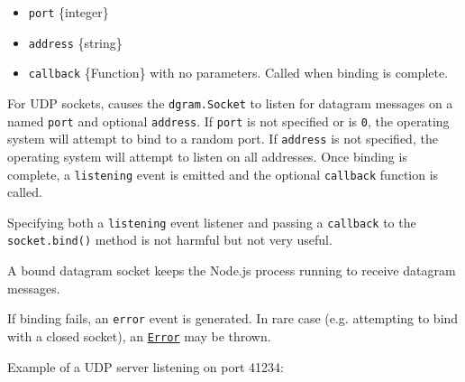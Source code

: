 \begin{itemize}
\tightlist
\item
  \texttt{port} \{integer\}
\item
  \texttt{address} \{string\}
\item
  \texttt{callback} \{Function\} with no parameters. Called when binding
  is complete.
\end{itemize}

For UDP sockets, causes the \texttt{dgram.Socket} to listen for datagram
messages on a named \texttt{port} and optional \texttt{address}. If
\texttt{port} is not specified or is \texttt{0}, the operating system
will attempt to bind to a random port. If \texttt{address} is not
specified, the operating system will attempt to listen on all addresses.
Once binding is complete, a
\texttt{\textquotesingle{}listening\textquotesingle{}} event is emitted
and the optional \texttt{callback} function is called.

Specifying both a \texttt{\textquotesingle{}listening\textquotesingle{}}
event listener and passing a \texttt{callback} to the
\texttt{socket.bind()} method is not harmful but not very useful.

A bound datagram socket keeps the Node.js process running to receive
datagram messages.

If binding fails, an \texttt{\textquotesingle{}error\textquotesingle{}}
event is generated. In rare case (e.g. attempting to bind with a closed
socket), an \href{errors.md\#class-error}{\texttt{Error}} may be thrown.

Example of a UDP server listening on port 41234:

